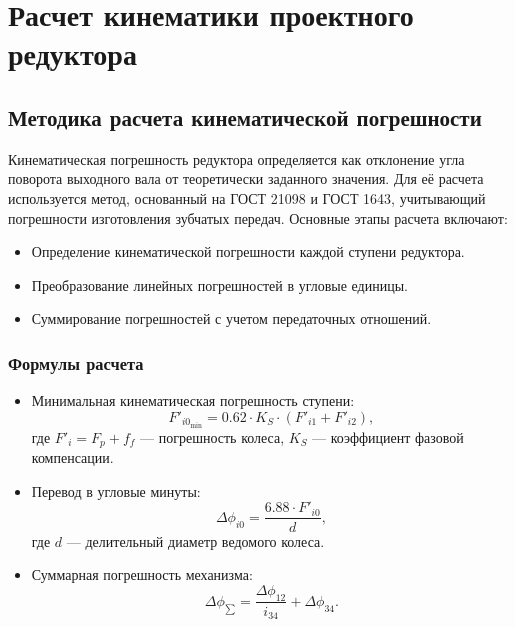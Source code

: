 \section{Расчет кинематики проектного редуктора}
\subsection{Методика расчета кинематической погрешности}

Кинематическая погрешность редуктора определяется как отклонение угла поворота выходного вала от теоретически заданного значения. 
Для её расчета используется метод, основанный на ГОСТ 21098 и ГОСТ 1643, учитывающий погрешности изготовления зубчатых передач. Основные этапы расчета включают:
\begin{itemize}
    \item Определение кинематической погрешности каждой ступени редуктора.
    \item Преобразование линейных погрешностей в угловые единицы.
    \item Суммирование погрешностей с учетом передаточных отношений.
\end{itemize}

\subsubsection{Формулы расчета}
\begin{itemize}
    \item Минимальная кинематическая погрешность ступени:
        \[
        F'_{i0_{\text{min}}} = 0.62 \cdot K_S \cdot (F'_{i1} + F'_{i2}),
        \]
        где \( F'_i = F_p + f_f \) — погрешность колеса, \( K_S \) — коэффициент фазовой компенсации.
    \item Перевод в угловые минуты:
        \[
        \Delta\phi_{i0} = \frac{6.88 \cdot F'_{i0}}{d},
        \]
        где \( d \) — делительный диаметр ведомого колеса.
    \item Суммарная погрешность механизма:
        \[
        \Delta\phi_{\sum} = \frac{\Delta\phi_{12}}{i_{34}} + \Delta\phi_{34}.
        \]
\end{itemize}

